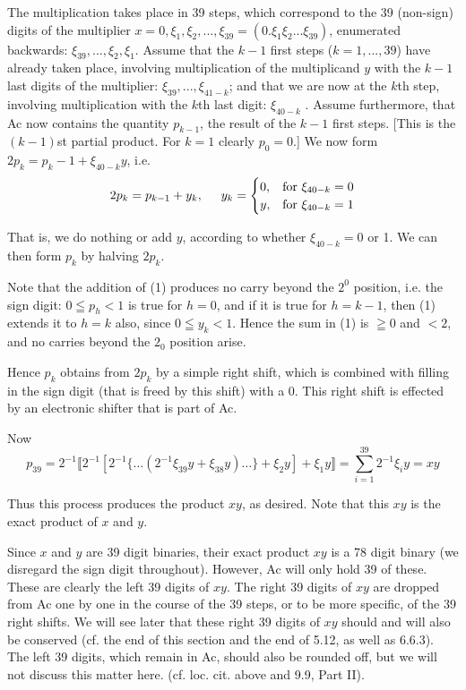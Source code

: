 \documentclass[12pt]{amsart}
\begin{document}
The multiplication takes place in 39 steps, which correspond to the 39 (non-sign) digits of the multiplier $x = 0, \xi_1, \xi_2, ... , \xi_{39} = (0.\xi_1\xi_2 ... \xi_{39})$, enumerated backwards: $\xi_{39}, ... , \xi_2, \xi_1$. Assume that the $k - 1$ first steps ($k = 1, ... , 39$) have already taken place, involving multiplication of the multiplicand $y$ with the $k - 1$ last digits of the multiplier: $\xi_{39}, ... , \xi_{41-k}$; and that we are now at the $k$th step, involving multiplication with the $k$th last digit: $\xi_{40-k}$ . Assume furthermore, that Ac now contains the quantity $p_{k-1}$, the result of the $k - 1$ first steps. [This is the $(k - 1)$st partial product. For $k = 1$ clearly $p_0 = 0$.] We now form $2p_k = p_k-1 + \xi_{40-k}y$, i.e.
\begin{equation}
    2p_k = p_{k-1} + y_k, \hspace{5mm} y_k = 
\begin{cases}
    0,& \text{for } \xi_{40-k} = 0\\
    y,& \text{for } \xi_{40-k} = 1
\end{cases}
\end{equation}

That is, we do nothing or add $y$, according to whether $\xi_{40-k} = 0$ or 1. We can then form $p_k$ by halving $2p_k$.

Note that the addition of (1) produces no carry beyond the $2^0$ position, i.e. the sign digit: $0 \leqq p_h < 1$ is true for $h = 0$, and if it is true for $h = k - 1$, then (1) extends it to $h = k$ also, since $0 \leqq y_k < 1$. Hence the sum in (1) is $\geqq 0$ and $< 2$, and no carries beyond the $2_0$ position arise.

Hence $p_k$ obtains from $2p_k$ by a simple right shift, which is combined with filling in the sign digit (that is freed by this shift) with a 0. This right shift is effected by an electronic shifter that is part of Ac.

Now
\[
p_{39} = 2^{-1}\llbracket2^{-1}[2^{-1}\{\dots(2^{-1}\xi_{39}y+\xi_{38}y)\dots\} + \xi_{2}y] + \xi_{1}y\rrbracket = \sum_{i = 1}^{39} 2^{-1}\xi_{i}y = xy
\]

Thus this process produces the product $xy$, as desired. Note that this $xy$ is the exact product of $x$ and $y$.

Since $x$ and $y$ are 39 digit binaries, their exact product $xy$ is a 78 digit binary (we disregard the sign digit throughout). However, Ac will only hold 39 of these. These are clearly the left 39 digits of $xy$. The right 39 digits of $xy$ are dropped from Ac one by one in the course of the 39 steps, or to be more specific, of the 39 right shifts. We will see later that these right 39 digits of $xy$ should and will also be conserved (cf. the end of this section and the end of 5.12, as well as 6.6.3). The left 39 digits, which remain in Ac, should also be rounded off, but we will not discuss this matter here. (cf. loc. cit. above and 9.9, Part II).
\end{document}
